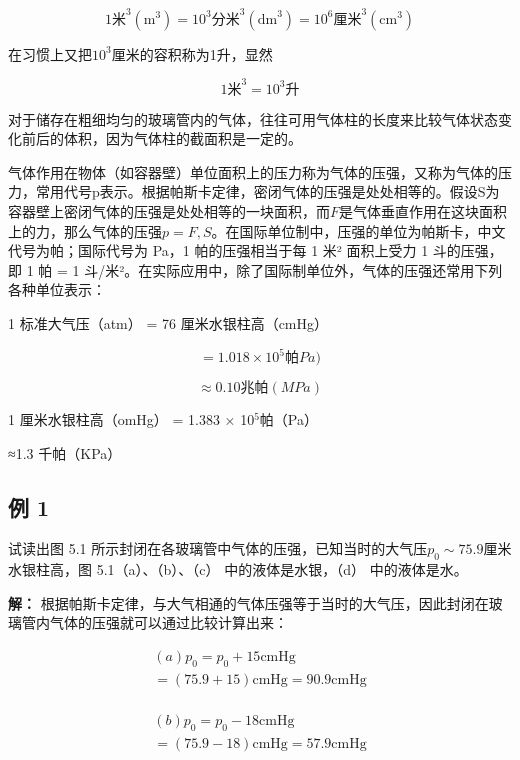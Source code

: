 \[
1 \text{米} ^ {3} (\mathrm{m} ^ {3}) = 10 ^ {3} \text{分米} ^ {3} (\mathrm{dm} ^ {3}) = 10 ^ {6} \text{厘米} ^ {3} (\mathrm{cm} ^ {3})
\]

在习惯上又把\(10^{3}\)厘米的容积称为1升，显然

\[
1 \text{米} ^ {3} = 10 ^ {3} \text{升}
\]

对于储存在粗细均匀的玻璃管内的气体，往往可用气体柱的长度来比较气体状态变化前后的体积，因为气体柱的截面积是一定的。

气体作用在物体（如容器壁）单位面积上的压力称为气体的压强，又称为气体的压力，常用代号p表示。根据帕斯卡定律，密闭气体的压强是处处相等的。假设S为容器壁上密闭气体的压强是处处相等的一块面积，而\(F\)是气体垂直作用在这块面积上的力，那么气体的压强\(p = F, S\)。在国际单位制中，压强的单位为帕斯卡，中文代号为帕；国际代号为
Pa，1 帕的压强相当于每 1 米² 面积上受力 1 斗的压强，即 1 帕 = 1
斗/米²。在实际应用中，除了国际制单位外，气体的压强还常用下列各种单位表示：

1 标准大气压（atm） = 76 厘米水银柱高（cmHg）

\[
= 1.018 \times 10 ^ {5} \text{帕} P a)
\]

\[
\approx 0.10 \text{兆帕} (M P a)
\]

1 厘米水银柱高（omHg） = 1.383 × 10\(^{5}\)帕（Pa）

≈1.3 千帕（KPa）

\subsection{例 1}\label{ux4f8b-1-4}

试读出图 5.1
所示封闭在各玻璃管中气体的压强，已知当时的大气压\(p_{0} \sim 75.9\)厘米水银柱高，图
5.1（a）、（b）、（c） 中的液体是水银，（d） 中的液体是水。

\textbf{解：}
根据帕斯卡定律，与大气相通的气体压强等于当时的大气压，因此封闭在玻璃管内气体的压强就可以通过比较计算出来：

\[
\begin{array}{l} (a) p _ {0} = p _ {0} + 15 \mathrm{cmHg} \\ = (75.9 + 15) \mathrm{cmHg} = 90.9 \mathrm{cmHg} \\ \end{array}
\]

\[
\begin{array}{l} (b) p _ {0} = p _ {0} - 18 \mathrm{cmHg} \\ = (75.9 - 18) \mathrm{cmHg} = 57.9 \mathrm{cmHg} \\ \end{array}
\]

